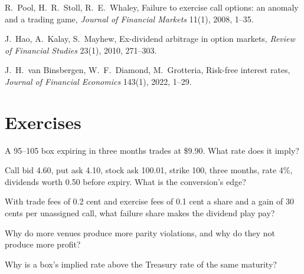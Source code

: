 \begin{omsources}
\item R.~Pool, H.~R.~Stoll, R.~E.~Whaley, Failure to exercise call options: an anomaly and a trading game, \emph{Journal of Financial Markets}
11(1), 2008, 1--35.
\item J.~Hao, A.~Kalay, S.~Mayhew, Ex-dividend arbitrage in option markets, \emph{Review of Financial Studies} 23(1), 2010, 271--303.
\item J.~H.~van Binsbergen, W.~F.~Diamond, M.~Grotteria, Risk-free interest rates, \emph{Journal of Financial Economics} 143(1), 2022, 1--29.
\end{omsources}

\section{Exercises}

\begin{exercise}[$\star$]\label{exo:hf:options-cross-venue-and-volatility-arbitrage-at-speed:1}
A 95--105 box expiring in three months trades at \$9.90. What rate does it imply?
\end{exercise}

\begin{exercise}[$\star$]\label{exo:hf:options-cross-venue-and-volatility-arbitrage-at-speed:2}
Call bid 4.60, put ask 4.10, stock ask 100.01, strike 100, three months, rate 4\%, dividends worth 0.50 before expiry. What is the conversion's edge?
\end{exercise}

\begin{exercise}[$\star$]\label{exo:hf:options-cross-venue-and-volatility-arbitrage-at-speed:3}
With trade fees of 0.2 cent and exercise fees of 0.1 cent a share and a gain of 30 cents per unassigned call, what failure share makes the dividend
play pay?
\end{exercise}

\begin{exercise}[$\star\star$]\label{exo:hf:options-cross-venue-and-volatility-arbitrage-at-speed:4}
Why do more venues produce more parity violations, and why do they not produce more profit?
\end{exercise}

\begin{exercise}[$\star\star$]\label{exo:hf:options-cross-venue-and-volatility-arbitrage-at-speed:5}
Why is a box's implied rate above the Treasury rate of the same maturity?
\end{exercise}

